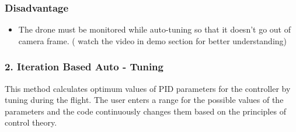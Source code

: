 \documentclass[a4paper,12pt,oneside]{book}
\begin{document}
\subsubsection{Disadvantage}
\begin{itemize}
    \item The drone must be monitored while auto-tuning so that it doesn't go out of camera frame.
    ( watch the video in demo section for better understanding)
\end{itemize}

  
   
   
  
    













































\pagebreak
\subsubsection{2. Iteration Based Auto - Tuning}

This method calculates optimum values of PID parameters for the controller by tuning during the flight. The user enters a range for the possible values of the parameters and the code continuously changes them based on the principles of control theory.
\end{document}
